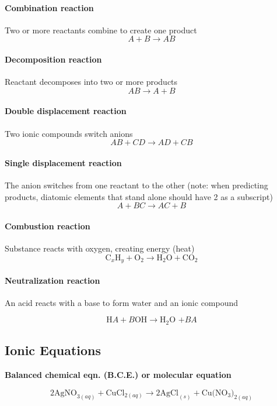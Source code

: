 \documentclass[a4paper, 12pt]{article}
\begin{document}
\paragraph{Combination reaction}
Two or more reactants combine to create one product
$$ A + B \longrightarrow AB$$

\paragraph{Decomposition reaction}
Reactant decomposes into two or more products
$$ AB \longrightarrow A + B$$ 

\paragraph{Double displacement reaction}
Two ionic compounds switch anions
$$ AB + CD \longrightarrow AD + CB$$ 

\paragraph{Single displacement reaction}
The anion switches from one reactant to the other (note: when predicting products, diatomic elements that stand alone should have 2 as a subscript)
$$ A + BC \longrightarrow AC + B$$ 

\paragraph{Combustion reaction}
Substance reacts with oxygen, creating energy (heat)
$$ \text{C}_x\text{H}_y + \text{O}_2 \longrightarrow \text{H}_2\text{O} + \text{CO}_2$$

\paragraph{Neutralization reaction}
An acid reacts with a base to form water and an ionic compound

$$\text{H}A + B\text{OH} \longrightarrow \text{H$_2$O +} BA $$

\subsection{Ionic Equations}

\textbf{Balanced chemical eqn. (B.C.E.) or molecular equation}

$$2\text{AgNO}_{3(aq)} + \text{CuCl}_{2(aq)} \longrightarrow 2\text{AgCl}_{(s)} + \text{Cu(NO$_3$)}_{2(aq)}$$
\end{document}
